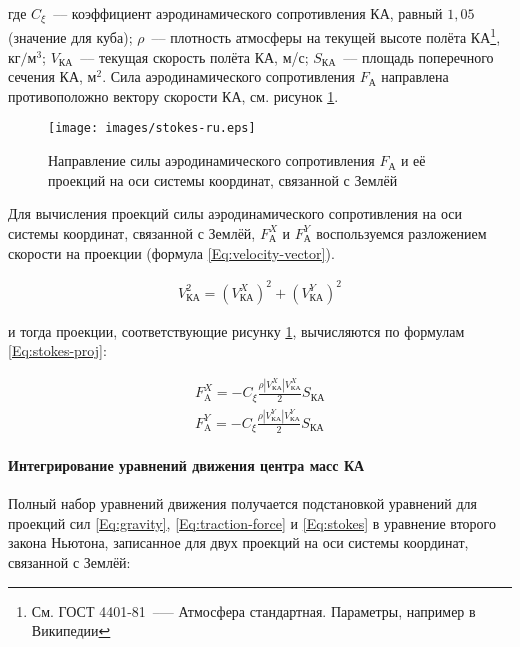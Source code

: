 \documentclass[12pt,a4paper]{article}
\begin{document}
где $C_\xi$~--– коэффициент аэродинамического сопротивления КА, равный $1,05$ (значение
для куба); $\rho$~--– плотность атмосферы на текущей высоте полёта КА\footnote{См. ГОСТ
  4401-81~--— Атмосфера стандартная. Параметры, например в Википедии},
$\text{кг}/\text{м}^3$; $V_{\text{КА}}$~--– текущая скорость полёта КА, м/с;
$S_{\text{КА}}$~--– площадь поперечного сечения КА, $\text{м}^2$. Сила аэродинамического
сопротивления $F_{\text{А}}$ направлена противоположно вектору скорости КА, см. рисунок
\ref{Pic:Stokes}.

\begin{figure}[tbh]
  \begin{center}
    \texttt{[image: images/stokes-ru.eps]}
    \caption{Направление силы аэродинамического сопротивления $F_{\text{А}}$ и её проекций
      на оси системы координат, связанной с Землёй}
    \label{Pic:Stokes}
  \end{center}
\end{figure}

Для вычисления проекций силы аэродинамического сопротивления на оси системы координат, связанной с
Землёй, $F_{\text{А}}^X$ и $F_{\text{А}}^Y$ воспользуемся разложением скорости на проекции
(формула \ref{Eq:velocity-vector}).

\begin{eqnarray}
  V_{\text{КА}}^2 = \left( V_{\text{КА}}^X \right)^2 + \left( V_{\text{КА}}^Y \right)^2
  \label{Eq:velocity-vector}
\end{eqnarray}

и тогда проекции, соответствующие рисунку \ref{Pic:Stokes}, вычисляются по формулам
\ref{Eq:stokes-proj}:

\begin{eqnarray}
  F_{\text{A}}^X = - C_\xi \frac{\rho \left| V_{\text{КА}}^X \right| V_{\text{КА}}^X}{2} S_{\text{КА}} \nonumber \\
  F_{\text{A}}^Y = - C_\xi \frac{\rho \left| V_{\text{КА}}^Y \right| V_{\text{КА}}^Y}{2} S_{\text{КА}} \label{Eq:stokes-proj}
\end{eqnarray}

\paragraph{Интегрирование уравнений движения центра масс КА}

Полный набор уравнений движения получается подстановкой уравнений для проекций сил
\ref{Eq:gravity}, \ref{Eq:traction-force} и \ref{Eq:stokes} в уравнение второго закона
Ньютона, записанное для двух проекций на оси системы координат, связанной с Землёй:
\end{document}
